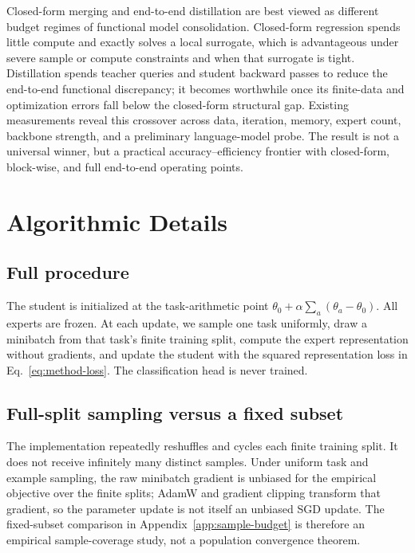 \documentclass[letterpaper]{article} %
\theoremstyle{plain}
\theoremstyle{definition}
\begin{document}
Closed-form merging and end-to-end distillation are best viewed as different budget
regimes of functional model consolidation. Closed-form regression spends little compute
and exactly solves a local surrogate, which is advantageous under severe sample or compute
constraints and when that surrogate is tight. Distillation spends teacher queries and
student backward passes to reduce the end-to-end functional discrepancy; it becomes
worthwhile once its finite-data and optimization errors fall below the closed-form
structural gap. Existing measurements reveal this crossover across data, iteration,
memory, expert count, backbone strength, and a preliminary language-model probe. The
result is not a universal winner, but a practical accuracy--efficiency frontier with
closed-form, block-wise, and full end-to-end operating points.



\appendix
\section{Algorithmic Details}
\label{app:algorithm}

\subsection{Full procedure}
The student is initialized at the task-arithmetic point
$\theta_0+\alpha\sum_a(\theta_a-\theta_0)$. All experts are frozen. At each update,
we sample one task uniformly, draw a minibatch from that task's finite training split,
compute the expert representation without gradients, and update the student with the
squared representation loss in Eq.~\eqref{eq:method-loss}. The classification head is
never trained.

\subsection{Full-split sampling versus a fixed subset}
The implementation repeatedly reshuffles and cycles each finite training split. It does
not receive infinitely many distinct samples. Under uniform task and example sampling,
the raw minibatch gradient is unbiased for the empirical objective over the finite
splits; AdamW and gradient clipping transform that gradient, so the parameter update is
not itself an unbiased SGD update. The fixed-subset comparison in
Appendix~\ref{app:sample-budget} is therefore an empirical sample-coverage study, not a
population convergence theorem.
\end{document}
